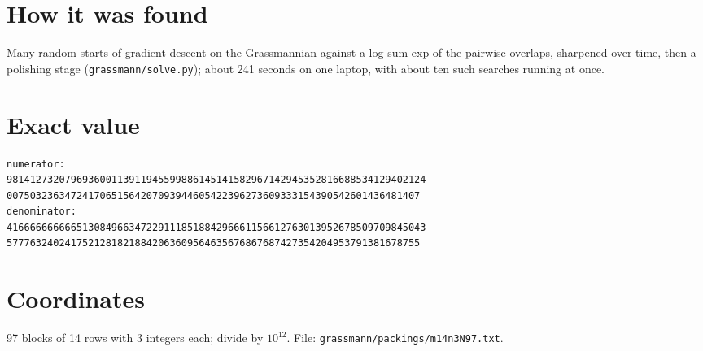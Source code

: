 \documentclass[11pt,a4paper]{article}
\begin{document}
\section{How it was found}
Many random starts of gradient descent on the Grassmannian against a log-sum-exp of the pairwise overlaps, sharpened over time, then a polishing stage (\texttt{grassmann/solve.py}); about 241 seconds on one laptop, with about ten such searches running at once.


\appendix
\section{Exact value}
{\small
\begin{verbatim}
numerator:
981412732079693600113911945599886145141582967142945352816688534129402124
00750323634724170651564207093944605422396273609333154390542601436481407
denominator:
416666666666513084966347229111851884296661156612763013952678509709845043
57776324024175212818218842063609564635676867687427354204953791381678755
\end{verbatim}}

\section{Coordinates}
97 blocks of 14 rows with 3 integers each; divide by $10^{12}$. File: \texttt{grassmann/packings/m14n3N97.txt}.
{\tiny
\begin{multicols}{3}
\end{multicols}}
\end{document}
